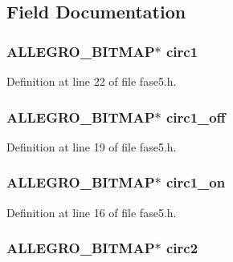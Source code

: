 \subsection{Field Documentation}
\hypertarget{struct_level_cinco_a9877f31790b6d2f38fb468a9448223f1}{
\subsubsection[{circ1}]{\setlength{\rightskip}{0pt plus 5cm}A\-L\-L\-E\-G\-R\-O\-\_\-\-B\-I\-T\-M\-A\-P$\ast$ circ1}}\label{struct_level_cinco_a9877f31790b6d2f38fb468a9448223f1}


Definition at line 22 of file fase5.\-h.

\hypertarget{struct_level_cinco_a61973bafd11ab9dea9306731297f4728}{
\subsubsection[{circ1\-\_\-off}]{\setlength{\rightskip}{0pt plus 5cm}A\-L\-L\-E\-G\-R\-O\-\_\-\-B\-I\-T\-M\-A\-P$\ast$ circ1\-\_\-off}}\label{struct_level_cinco_a61973bafd11ab9dea9306731297f4728}


Definition at line 19 of file fase5.\-h.

\hypertarget{struct_level_cinco_a15699608afb18fad793848cd8fd32fe0}{
\subsubsection[{circ1\-\_\-on}]{\setlength{\rightskip}{0pt plus 5cm}A\-L\-L\-E\-G\-R\-O\-\_\-\-B\-I\-T\-M\-A\-P$\ast$ circ1\-\_\-on}}\label{struct_level_cinco_a15699608afb18fad793848cd8fd32fe0}


Definition at line 16 of file fase5.\-h.

\hypertarget{struct_level_cinco_a1b8836cb8a00a286c87bfbafdacbd03d}{
\subsubsection[{circ2}]{\setlength{\rightskip}{0pt plus 5cm}A\-L\-L\-E\-G\-R\-O\-\_\-\-B\-I\-T\-M\-A\-P$\ast$ circ2}}\label{struct_level_cinco_a1b8836cb8a00a286c87bfbafdacbd03d}


